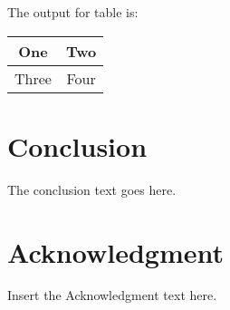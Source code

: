 \documentclass{IET}%
\begin{document}
\vskip2pc

\noindent The output for table is:

\begin{table}[!h]
{%
\begin{tabular}{|c||c|}%
\hline
One & Two\\ %
\hline
Three & Four\\%
\hline
\end{tabular}}{}
\end{table}%

\section{Conclusion}
The conclusion text goes here.

\section{Acknowledgment}

Insert the Acknowledgment text here.
\end{document}
